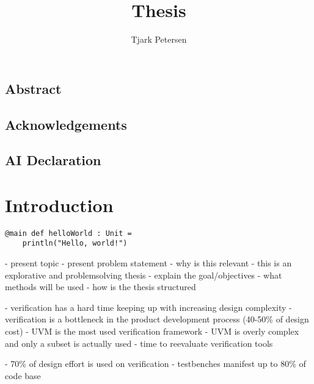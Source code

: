 \documentclass[12pt]{report}
\author{Tjark Petersen}
\title{Thesis}
\begin{document}
\maketitle

\section*{Abstract} %

\section*{Acknowledgements} %

\section*{AI Declaration} %

\newpage

\tableofcontents

\chapter{Introduction} %

\begin{lstlisting}
@main def helloWorld : Unit =
    println("Hello, world!")
\end{lstlisting}
- present topic
- present problem statement
- why is this relevant
- this is an explorative and problemsolving thesis
- explain the goal/objectives
- what methods will be used
- how is the thesis structured

- verification has a hard time keeping up with increasing design complexity
- verification is a bottleneck in the product development process (40-50\% of design cost) \cite{mehta2018asic}
- UVM is the most used verification framework
- UVM is overly complex and only a subset is actually used \cite{sutherland2015uvm}
- time to reevaluate verification tools

- 70\% of design effort is used on verification \cite[Ch. 1]{bergeron2012writing}
- testbenches manifest up to 80\% of code base \cite[Ch. 1]{bergeron2012writing}
\end{document}

